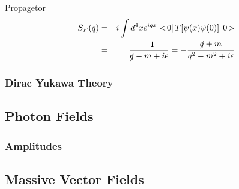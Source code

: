 \documentclass{jarticle}
\newcommand{\bra}[0]{<\!}
\newcommand{\braend}[0]{|\,}
\newcommand{\ketend}[0]{\,|}
\newcommand{\ket}[0]{\!>}
\newcommand{\myqftsrcdirectory}[0]{./}
\newcommand{\mainqftsrcdirectory}[0]{../src_qft}
\begin{document}
Propagetor
\begin{eqnarray}
S_F(q) &=& i \int d^4x e^{iqx}
\bra 0 \braend T[\psi(x) \bar{\psi}(0)]
\ketend 0 \ket
\nonumber\\
&=&
\frac{-1}{\slashed{q} - m + i \epsilon}
=
- \frac{\slashed{q} + m}{ q^2 - m^2 + i \epsilon}
\end{eqnarray}

\subsubsection{Dirac Yukawa Theory}
\label{sec:DiracYukawa}




\begin{comment}
\subsubsection{Majorana Field}
Massless, spin1/2, selfconjugate.
\begin{equation}
i \slashed{\partial} \psi(x) = 0\,,
\hspace{3mm}
\bar{\psi}(x) i \stackrel{\leftarrow}{\slashed{\partial}}   = 0
\end{equation}
\end{comment}

\newpage
\subsection{Photon Fields}


\subsubsection{Amplitudes}



\newpage
\subsection{Massive Vector  Fields}


\newpage
\end{document}
